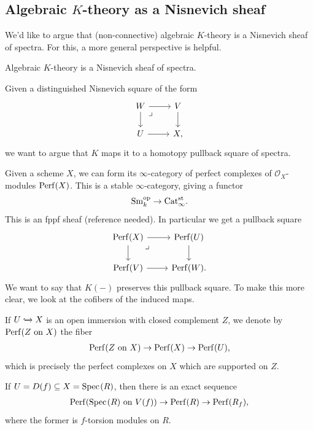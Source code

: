 \documentclass[11pt,openany]{book}
\begin{document}
\subsection{Algebraic $K$-theory as a Nisnevich sheaf}

We'd like to argue that (non-connective) algebraic $K$-theory is a Nisnevich sheaf of spectra. For this, a more general perspective is helpful.

\begin{theorem}[{\cite{TT}}] Algebraic $K$-theory is a Nisnevich sheaf of spectra.
\end{theorem}

Given a distinguished Nisnevich square of the form
\[ \begin{tikzcd}
    W\rar\dar\pb & V\dar\\
    U\rar & X,
\end{tikzcd} \]
we want to argue that $K$ maps it to a homotopy pullback square of spectra.

Given a scheme $X$, we can form its $\infty$-category of perfect complexes of $\mathcal{O}_X$-modules $\mathrm{Perf}(X)$. This is a stable $\infty$-category, giving a functor
\begin{align*}
    \mathrm{Sm}_k^{\mathrm{op}} \to \mathrm{Cat}_\infty^{\mathrm{st}}.
\end{align*}
%
This is an fppf sheaf (reference needed). In particular we get a pullback square
\[ \begin{tikzcd}
    \Perf(X)\rar\dar\pb & \Perf(U)\dar\\
    \Perf(V)\rar & \Perf(W).
\end{tikzcd} \]
We want to say that $K(-)$ preserves this pullback square. To make this more clear, we look at the cofibers of the induced maps.

\begin{notation} If $U \xhookrightarrow{} X$ is an open immersion with closed complement $Z$, we denote by $\mathrm{Perf}(Z\text{ on }X)$ the fiber
\begin{align*}
    \mathrm{Perf}(Z\text{ on }X) \to \mathrm{Perf}(X) \to \mathrm{Perf}(U),
\end{align*}
which is precisely the perfect complexes on $X$ which are supported on $Z$.
\end{notation}

\begin{example} If $U = D(f) \subseteq X = \text{Spec}\hspace{0.1em}(R)$, then there is an exact sequence
\begin{align*}
    \mathrm{Perf}(\text{Spec}\hspace{0.1em}(R) \text{ on } V(f)) \to \mathrm{Perf}(R) \to \mathrm{Perf}(R_f),
\end{align*}
where the former is $f$-torsion modules on $R$.
\end{example}
\end{document}
